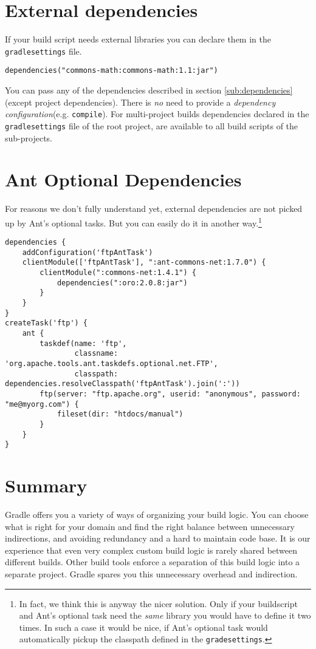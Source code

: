 \section{External dependencies} %
\label{sec:external_dependencies}
If your build script needs external libraries you can declare them in the \texttt{gradlesettings} file.
\begin{Verbatim}[label=gradlesettings]
dependencies("commons-math:commons-math:1.1:jar")
\end{Verbatim}
You can pass any of the dependencies described in section \ref{sub:dependencies} (except project dependencies). There is \emph{no} need to provide a \emph{dependency configuration}(e.g. \texttt{compile}). For multi-project builds dependencies declared in the \texttt{gradlesettings} file of the root project, are available to all build scripts of the sub-projects.

\section{Ant Optional Dependencies} %
\label{sec:ant_optional_dependencies}
For reasons we don't fully understand yet, external dependencies are not picked up by Ant's optional tasks. But you can easily do it in another way.\footnote{In fact, we think this is anyway the nicer solution. Only if your buildscript and Ant's optional task need the \emph{same} library you would have to define it two times. In such a case it would be nice, if Ant's optional task would automatically pickup the classpath defined in the \texttt{gradesettings}.}
\begin{Verbatim}[label=gradlesettings]
dependencies {
    addConfiguration('ftpAntTask')
    clientModule(['ftpAntTask'], ":ant-commons-net:1.7.0") {
        clientModule(":commons-net:1.4.1") {
            dependencies(":oro:2.0.8:jar")
        }
    }
}
createTask('ftp') {
    ant {
        taskdef(name: 'ftp',
                classname: 'org.apache.tools.ant.taskdefs.optional.net.FTP',
                classpath: dependencies.resolveClasspath('ftpAntTask').join(':'))
        ftp(server: "ftp.apache.org", userid: "anonymous", password: "me@myorg.com") {
            fileset(dir: "htdocs/manual")
        }
    }
}
\end{Verbatim}

\section{Summary} %
\label{sec:philosophy}
Gradle offers you a variety of ways of organizing your build logic. You can choose what is right for your domain and find the right balance between unnecessary indirections, and avoiding redundancy and a hard to maintain code base.
It is our experience that even very complex custom build logic is rarely shared between different builds. Other build tools enforce a separation of this build logic into a separate project. Gradle spares you this unnecessary overhead and indirection.


